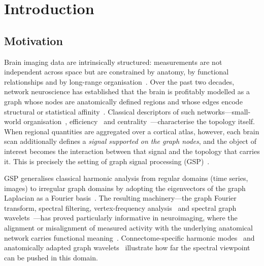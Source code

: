 \documentclass[11pt,reqno]{amsart}
\theoremstyle{plain}
\theoremstyle{definition}
\theoremstyle{remark}
\numberwithin{equation}{section}
\begin{document}
\maketitle

\section{Introduction}
\label{sec:intro}

\subsection{Motivation}

Brain imaging data are intrinsically structured: measurements are not
independent across space but are constrained by anatomy, by functional
relationships and by long-range organisation~\cite{bullmore2009complex,
sporns2005human}. Over the past two decades, network neuroscience has
established that the brain is profitably modelled as a graph whose nodes are
anatomically defined regions and whose edges encode structural or statistical
affinity~\cite{bassett2017network,rubinov2010complex,fornito2016fundamentals}.
Classical descriptors of such networks---small-world
organisation~\cite{watts1998collective}, efficiency~\cite{latora2001efficient}
and centrality~\cite{rubinov2010complex}---characterise the topology itself.
When regional quantities are aggregated over a cortical atlas, however, each
brain scan additionally defines a \emph{signal supported on the graph nodes},
and the object of interest becomes the interaction between that signal and the
topology that carries it. This is precisely the setting of graph signal
processing (GSP)~\cite{shuman2013emerging,ortega2018graph,sandryhaila2013discrete}.

GSP generalises classical harmonic analysis from regular domains (time series,
images) to irregular graph domains by adopting the eigenvectors of the graph
Laplacian as a Fourier basis~\cite{shuman2013emerging,chung1997spectral,
mohar1991laplacian,merris1994laplacian}. The resulting machinery---the graph
Fourier transform, spectral filtering, vertex-frequency
analysis~\cite{shuman2016vertex} and spectral graph
wavelets~\cite{hammond2011wavelets,tremblay2014graph}---has proved particularly
informative in neuroimaging, where the alignment or misalignment of measured
activity with the underlying anatomical network carries functional
meaning~\cite{huang2018graph,huang2016graph,medaglia2018functional,
preti2019decoupling}. Connectome-specific harmonic
modes~\cite{atasoy2016human} and anatomically adapted graph
wavelets~\cite{behjat2015anatomically} illustrate how far the spectral viewpoint
can be pushed in this domain.
\end{document}
